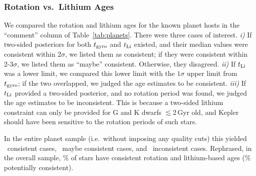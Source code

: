 \documentclass[11pt,twocolumn,tighten]{aastex63}
\begin{document}
\subsubsection{Rotation vs.~Lithium Ages}

We compared 
the rotation and lithium ages for the
known planet hosts 
in the ``comment'' column of Table~\ref{tab:planets}.
There were three cases of interest.
{\it i)} If two-sided posteriors for both $t_{\rm gyro}$ and $t_{\rm Li}$ existed,
and their median values were consistent within 2$\sigma$, we listed them
as consistent; if they were consistent within 2-3$\sigma$, we
listed them as ``maybe'' consistent.  Otherwise, they
disagreed.
{\it ii)}
If $t_{\rm Li}$ was a lower limit, we compared this lower limit
with the $1\sigma$ upper limit from $t_{\rm gyro}$; if the two
overlapped, we judged the age estimates to be consistent.
{\it iii)}
If $t_{\rm Li}$ provided a two-sided posterior, and no
rotation period was found, we judged the age estimates to be
inconsistent.  This is because a two-sided lithium constraint can only be
provided for G and K dwarfs $\lesssim$2\,Gyr old, and Kepler should
have been sensitive to the rotation periods of such stars.



In the entire planet sample (i.e.~without imposing any quality cuts) this
yielded \allagesyesconsistent\ consistent cases,
\allagesmaybeconsistent\ maybe consistent cases, and
\allagesnoconsistent\ inconsistent cases.  Rephrased, in the overall
sample, \fracconsistentallages\% of stars have consistent rotation and
lithium-based ages (\fracpotentiallyconsistentallages\% potentially
consistent).
\end{document}
